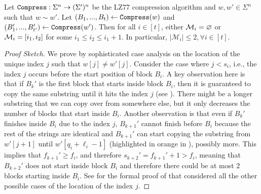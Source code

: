 



\newcommand{\lemstartinsidestatement}{
Let $\compress:\Sigma^n\rightarrow(\Sigma')^n$ be the LZ77 compression algorithm and $w,w'\in\Sigma^n$ such that $w\sim w'$. Let $(B_1,...,B_t)\gets\compress(w)$ and $(B'_1,...,B'_{t'})\gets\compress(w')$. Then for all $i\in[t]$, either $\M_i = \varnothing$ or $\M_i=[i_1,i_2]$ for some $i_1\leq i_2\leq i_1+1$. In particular, $|\mathcal{M}_i|\leq 2, \forall i \in [t]$.
}
\begin{lemma}
    \lemstartinsidestatement
\end{lemma}

\begin{proof}[Proof Sketch]
We prove  by sophisticated case analysis on the location of the unique index $j$ such that $w[j]\neq w'[j]$. Consider the case where $j<s_i$, i.e., the index $j$ occurs before the start position of block $B_i$. 
A key observation here is that if $B_k'$ is the first block that starts inside block $B_i$, then it is guaranteed to copy the same substring until it hits the index $j$ (see ). There might be a longer substring that we can copy over from somewhere else, but it only decreases the number of blocks that start inside $B_i$. Another observation is that even if $B_k'$ finishes inside $B_i$ due to the index $j$, $B_{k+1}'$ cannot finish before $B_i$ because the rest of the strings are identical and $B_{k+1}'$ can start copying the substring from $w'[j+1]$ until $w'[q_i+\ell_i-1]$ (highlighted in orange in ), possibly more. This implies that $f_{k+1}'\geq f_i$, and therefore $s_{k+2}'=f_{k+1}'+1>f_i$, meaning that $B_{k+2}'$ does not start inside block $B_i$ and therefore there could be at most $2$ blocks starting inside $B_i$. See  for the formal proof of  that considered all the other possible cases of the location of the index $j$.
\end{proof}

